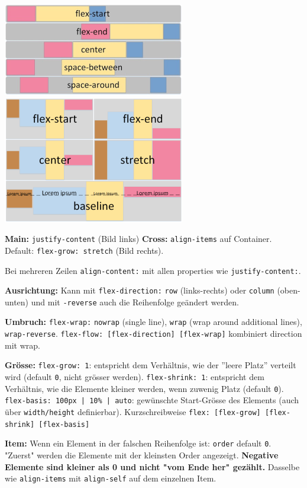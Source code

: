 \documentclass[a4paper, fontsize=6pt]{scrartcl}
\newcommand{\css}[1]{\texttt{#1}}
\begin{document}
\begin{multicols*}{5}
\includegraphics[scale=0.55]{flex-horizontal.png}
\includegraphics[scale=0.3]{flex-vertical.png}

\textbf{Main:} \css{justify-content} (Bild links)
\textbf{Cross:} \css{align-items} auf Container. Default: \css{flex-grow: stretch} (Bild rechts).


Bei mehreren Zeilen \css{align-content:} mit allen properties wie \css{justify-content:}.

\textbf{Ausrichtung:} Kann mit \css{flex-direction:} \css{row} (links-rechts) oder \css{column} (oben-unten) und mit \css{-reverse} auch die Reihenfolge geändert werden.

\textbf{Umbruch:} \css{flex-wrap:} \css{nowrap} (single line), \css{wrap} (wrap around additional lines), \css{wrap-reverse}. \css{flex-flow: [flex-direction] [flex-wrap]} kombiniert direction mit wrap.

\textbf{Grösse:} 
\css{flex-grow: 1}: entspricht dem Verhältnis, wie der ''leere Platz'' verteilt wird (default \css{0}, nicht grösser werden). \css{flex-shrink: 1}: entspricht dem Verhältnis, wie die Elemente kleiner werden, wenn zuwenig Platz (default \css{0}). \css{flex-basis: 100px | 10\% | auto}: gewünschte Start-Grösse des Elements (auch über \css{width/height} definierbar). Kurzschreibweise \css{flex: [flex-grow] [flex-shrink] [flex-basis]}

\textbf{Item:} Wenn ein Element in der falschen Reihenfolge ist: \css{order} default \css{0}. "Zuerst" werden die Elemente mit der kleinsten Order angezeigt. \textbf{Negative Elemente sind kleiner als 0 und nicht "vom Ende her" gezählt.} %
Dasselbe wie \css{align-items}  mit \css{align-self} auf dem einzelnen Item.


\end{multicols*}
\end{document}
